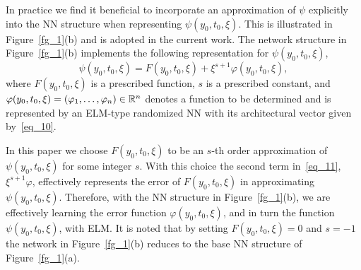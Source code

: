
In practice we find it beneficial to incorporate an approximation
of $\psi$ explicitly into the NN structure
when representing $\psi(y_0,t_0,\xi)$.
This is illustrated in Figure~\ref{fg_1}(b)
and is adopted in the current work.
The network structure in Figure~\ref{fg_1}(b)
implements the following representation
for $\psi(y_0,t_0,\xi)$,
\begin{equation}\label{eq_11}
  \psi(y_0,t_0,\xi) = F(y_0,t_0,\xi) + \xi^{s+1}\varphi(y_0,t_0,\xi),
\end{equation}
where $F(y_0,t_0,\xi)$ is a prescribed function, $s$ is a prescribed constant,
and $\varphi(y_0,t_0,\xi)=(\varphi_1,\dots,\varphi_n)\in\mathbb{R}^n$
denotes a function to be determined and
is represented by an ELM-type randomized NN with its architectural
vector given by~\eqref{eq_10}.

In this paper we choose $F(y_0,t_0,\xi)$ to be an $s$-th order
approximation of $\psi(y_0,t_0,\xi)$ for some integer $s$. With this choice
the second term in~\eqref{eq_11}, $\xi^{s+1}\varphi$, effectively represents
the error of $F(y_0,t_0,\xi)$ in approximating $\psi(y_0,t_0,\xi)$.
Therefore, with the NN structure in Figure~\ref{fg_1}(b),
we are effectively learning the error function $\varphi(y_0,t_0,\xi)$,
and in turn the function $\psi(y_0,t_0,\xi)$, with ELM.
It is noted that by setting $F(y_0,t_0,\xi)=0$ and $s=-1$
the network in Figure~\ref{fg_1}(b) reduces to
the base NN structure of Figure~\ref{fg_1}(a).


